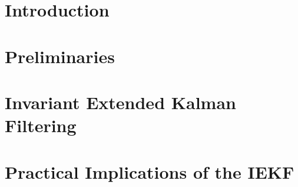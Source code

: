 \documentclass[reqno, 12pt, onesidie]{report}
\begin{document}
\listofabbreviations
\cleardoublepage

\listofsymbols

\cleardoublepage

\cleardoublepage
\setcounter{page}{1}
\renewcommand{\thepage}{\arabic{page}}


\cleardoublepage
\startthechapters



\cleardoublepage
    \chapter{Introduction}
    \label{chap:Intro}
    

\cleardoublepage
    \chapter{Preliminaries}
    \label{chap:preliminaries}
    


\cleardoublepage
    \chapter{Invariant Extended Kalman Filtering}
    \label{chap:IEKF}
    

\cleardoublepage
    \chapter{Practical Implications of the IEKF}
    \label{chap:SE3}
    
\end{document}
